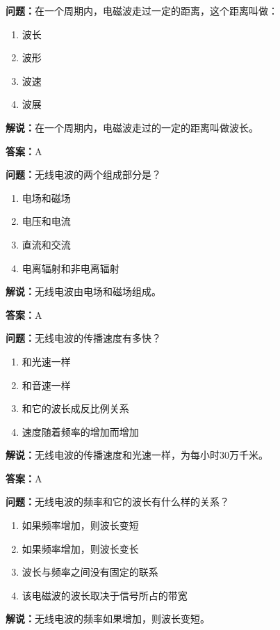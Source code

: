 \textbf{问题：}在一个周期内，电磁波走过一定的距离，这个距离叫做：

\begin{enumerate}[label=\Alph*), leftmargin=3em]
	\item 波长
	\item 波形
	\item 波速
	\item 波展
\end{enumerate}

\textbf{解说：}在一个周期内，电磁波走过的一定的距离叫做波长。%

\textbf{答案：}A

\textbf{问题：}无线电波的两个组成部分是？

\begin{enumerate}[label=\Alph*), leftmargin=3em]
	\item 电场和磁场
	\item 电压和电流
	\item 直流和交流
	\item 电离辐射和非电离辐射
\end{enumerate}

\textbf{解说：}无线电波由电场和磁场组成。%

\textbf{答案：}A

\textbf{问题：}无线电波的传播速度有多快？

\begin{enumerate}[label=\Alph*), leftmargin=3em]
	\item 和光速一样
	\item 和音速一样
	\item 和它的波长成反比例关系
	\item 速度随着频率的增加而增加
\end{enumerate}

\textbf{解说：}无线电波的传播速度和光速一样，为每小时30万千米。

\textbf{答案：}A

\textbf{问题：}无线电波的频率和它的波长有什么样的关系？

\begin{enumerate}[label=\Alph*), leftmargin=3em]
	\item 如果频率增加，则波长变短
	\item 如果频率增加，则波长变长
	\item 波长与频率之间没有固定的联系
	\item 该电磁波的波长取决于信号所占的带宽
\end{enumerate}

\textbf{解说：}无线电波的频率如果增加，则波长变短。

